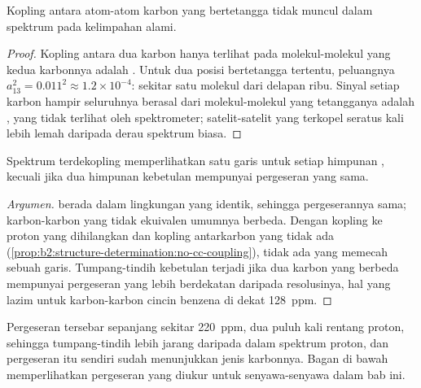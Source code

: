 \begin{proposition}\label{prop:b2:structure-determination:no-cc-coupling}
Kopling antara atom-atom karbon yang bertetangga tidak muncul dalam spektrum
 pada kelimpahan alami.
\end{proposition}

\begin{proof}
Kopling antara dua karbon hanya terlihat pada molekul-molekul yang kedua
karbonnya adalah . Untuk dua posisi bertetangga tertentu,
peluangnya $a_{13}^2 = 0.011^2 \approx 1.2 \times 10^{-4}$: sekitar satu
molekul dari delapan ribu. Sinyal setiap karbon hampir seluruhnya berasal
dari molekul-molekul yang tetangganya adalah , yang tidak terlihat
oleh spektrometer; satelit-satelit yang terkopel seratus kali lebih lemah
daripada derau spektrum biasa.
\end{proof}

\begin{proposition}\label{prop:b2:structure-determination:signals}
Spektrum  terdekopling memperlihatkan satu garis untuk setiap
himpunan , kecuali jika dua himpunan kebetulan mempunyai
pergeseran yang sama.
\end{proposition}

\begin{proof}[Argumen]
 berada dalam lingkungan yang identik, sehingga
pergeserannya sama; karbon-karbon yang tidak ekuivalen umumnya berbeda.
Dengan kopling ke proton yang dihilangkan dan kopling antarkarbon yang tidak
ada (\cref{prop:b2:structure-determination:no-cc-coupling}), tidak ada yang
memecah sebuah garis. Tumpang-tindih kebetulan terjadi jika dua karbon yang
berbeda mempunyai pergeseran yang lebih berdekatan daripada resolusinya, hal
yang lazim untuk karbon-karbon cincin benzena di dekat \qty{128}{ppm}.
\end{proof}

Pergeseran tersebar sepanjang sekitar \qty{220}{ppm}, dua puluh kali rentang
proton, sehingga tumpang-tindih lebih jarang daripada dalam spektrum proton,
dan pergeseran itu sendiri sudah menunjukkan jenis karbonnya. Bagan di bawah
memperlihatkan pergeseran yang diukur untuk senyawa-senyawa dalam bab ini.

